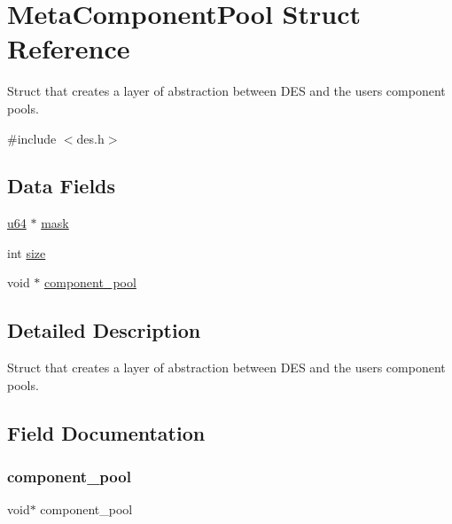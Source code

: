 \hypertarget{struct_meta_component_pool}{}\section{Meta\+Component\+Pool Struct Reference}
\label{struct_meta_component_pool}


Struct that creates a layer of abstraction between D\+ES and the user\textquotesingle{}s component pools.  




{\ttfamily \#include $<$des.\+h$>$}

\subsection*{Data Fields}
\begin{DoxyCompactItemize}
\item 
\mbox{\hyperlink{des__internal_8h_a3f7e2bcbb0b4c338f3c4f6c937cd4234}{u64}} $\ast$ \mbox{\hyperlink{struct_meta_component_pool_a43d2252901e2a4aa70563cfb707b6fa7}{mask}}
\item 
int \mbox{\hyperlink{struct_meta_component_pool_a439227feff9d7f55384e8780cfc2eb82}{size}}
\item 
void $\ast$ \mbox{\hyperlink{struct_meta_component_pool_a07582a80a343fc37057a7cc9baf4287e}{component\+\_\+pool}}
\end{DoxyCompactItemize}


\subsection{Detailed Description}
Struct that creates a layer of abstraction between D\+ES and the user\textquotesingle{}s component pools. 

\subsection{Field Documentation}
\mbox{\label{struct_meta_component_pool_a07582a80a343fc37057a7cc9baf4287e}} 
\subsubsection{\texorpdfstring{component\+\_\+pool}{component\_pool}}
{\footnotesize\ttfamily void$\ast$ component\+\_\+pool}

